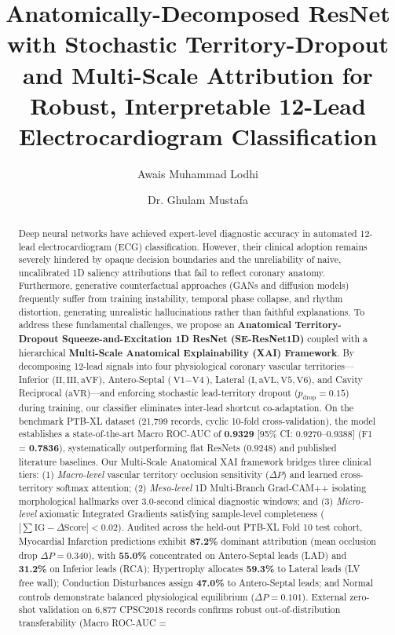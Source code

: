\documentclass[12pt]{elsarticle}
\begin{document}
\begin{frontmatter}

\title{Anatomically-Decomposed ResNet with Stochastic Territory-Dropout and Multi-Scale Attribution for Robust, Interpretable 12-Lead Electrocardiogram Classification}

\author[1]{Awais Muhammad Lodhi}
\author[1]{Dr. Ghulam Mustafa}

\address[1]{Department of Computer Science, FOIT\&CS, UCP, Pakistan}

\begin{abstract}
Deep neural networks have achieved expert-level diagnostic accuracy in automated 12-lead electrocardiogram (ECG) classification. However, their clinical adoption remains severely hindered by opaque decision boundaries and the unreliability of naive, uncalibrated 1D saliency attributions that fail to reflect coronary anatomy. Furthermore, generative counterfactual approaches (GANs and diffusion models) frequently suffer from training instability, temporal phase collapse, and rhythm distortion, generating unrealistic hallucinations rather than faithful explanations. To address these fundamental challenges, we propose an \textbf{Anatomical Territory-Dropout Squeeze-and-Excitation 1D ResNet (SE-ResNet1D)} coupled with a hierarchical \textbf{Multi-Scale Anatomical Explainability (XAI) Framework}. By decomposing 12-lead signals into four physiological coronary vascular territories---Inferior ($\text{II}, \text{III}, \text{aVF}$), Antero-Septal ($\text{V1}-\text{V4}$), Lateral ($\text{I}, \text{aVL}, \text{V5}, \text{V6}$), and Cavity Reciprocal ($\text{aVR}$)---and enforcing stochastic lead-territory dropout ($p_{\text{drop}} = 0.15$) during training, our classifier eliminates inter-lead shortcut co-adaptation. On the benchmark PTB-XL dataset (21,799 records, cyclic 10-fold cross-validation), the model establishes a state-of-the-art Macro ROC-AUC of \textbf{0.9329} [95\% CI: 0.9270--0.9388] (F1 = \textbf{0.7836}), systematically outperforming flat ResNets ($0.9248$) and published literature baselines. Our Multi-Scale Anatomical XAI framework bridges three clinical tiers: (1) \textit{Macro-level} vascular territory occlusion sensitivity ($\Delta P$) and learned cross-territory softmax attention; (2) \textit{Meso-level} 1D Multi-Branch Grad-CAM++ isolating morphological hallmarks over 3.0-second clinical diagnostic windows; and (3) \textit{Micro-level} axiomatic Integrated Gradients satisfying sample-level completeness ($|\sum \text{IG} - \Delta \text{Score}| < 0.02$). Audited across the held-out PTB-XL Fold 10 test cohort, Myocardial Infarction predictions exhibit \textbf{87.2\%} dominant attribution (mean occlusion drop $\Delta P = 0.340$), with \textbf{55.0\%} concentrated on Antero-Septal leads (LAD) and \textbf{31.2\%} on Inferior leads (RCA); Hypertrophy allocates \textbf{59.3\%} to Lateral leads (LV free wall); Conduction Disturbances assign \textbf{47.0\%} to Antero-Septal leads; and Normal controls demonstrate balanced physiological equilibrium ($\Delta P = 0.101$). External zero-shot validation on 6,877 CPSC2018 records confirms robust out-of-distribution transferability (Macro ROC-AUC = 
\end{abstract}
\end{frontmatter}
\end{document}
